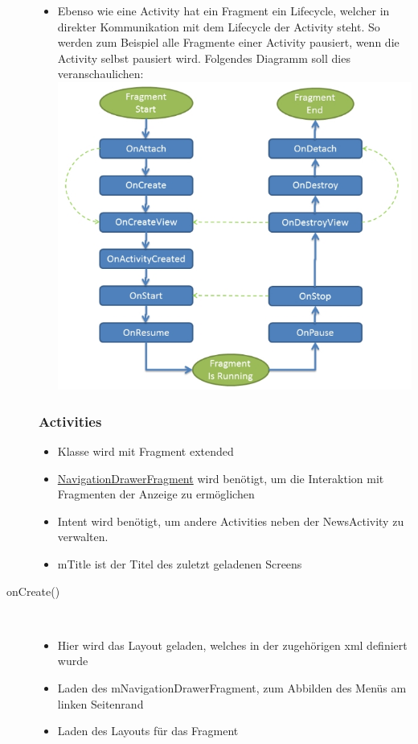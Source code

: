\begin{description}
\begin{itemize}
\item Ebenso wie eine Activity hat ein Fragment ein Lifecycle, welcher in direkter Kommunikation mit dem Lifecycle der Activity steht. So werden zum Beispiel alle Fragmente einer Activity pausiert, wenn die Activity selbst pausiert wird. Folgendes Diagramm soll dies veranschaulichen:\\
\includegraphics[scale=0.8]{05_Handbuch/img/LifeCycle_Fragment.jpg}
\end{itemize}

\newpage

\subsubsection{Activities}
\label{newsactitvity}
\begin{itemize}
\item Klasse wird mit Fragment extended
\item \hyperref[NavigationDrawerFragment]{NavigationDrawerFragment} wird benötigt, um die Interaktion mit Fragmenten der Anzeige zu ermöglichen
\item Intent wird benötigt, um andere Activities neben der NewsActivity zu verwalten.
\item mTitle ist der Titel des zuletzt geladenen Screens
\end{itemize}

 
\item[onCreate()]~\par
\begin{itemize}
\item Hier wird das Layout geladen, welches in der zugehörigen xml definiert wurde
\item Laden des mNavigationDrawerFragment, zum Abbilden des Menüs am linken Seitenrand
\item Laden des Layouts für das Fragment
 

\end{itemize}
\end{description}
